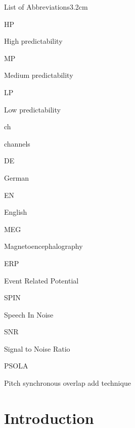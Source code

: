 \documentclass[a4paper, nobind]{templates/ociamthesis}
\begin{document}
\begin{romanpages}
\begin{mclistof}{List of Abbreviations}{3.2cm}
\item[HP]

High predictability

\item[MP]

Medium predictability

\item[LP]

Low predictability

\item[ch]

channels

\item[DE]

German

\item[EN]

English

\item[MEG]

Magnetoencephalography

\item[ERP]

Event Related Potential

\item[SPIN]

Speech In Noise

\item[SNR]

Signal to Noise Ratio

\item[PSOLA]

Pitch synchronous overlap add technique

\end{mclistof} 


\end{romanpages}

\flushbottom

\hypertarget{chapter-introduction}{%
\chapter{Introduction}\label{chapter-introduction}}
\end{document}
